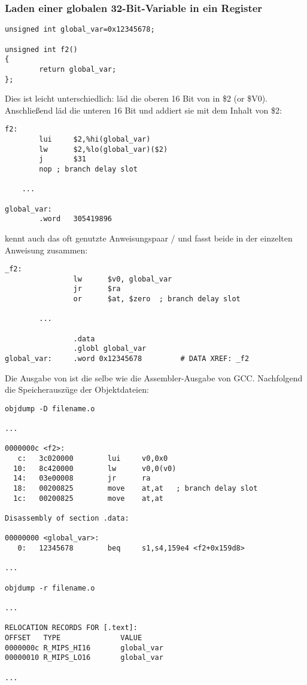 \subsubsection{Laden einer globalen 32-Bit-Variable in ein Register}

\begin{lstlisting}
unsigned int global_var=0x12345678;

unsigned int f2()
{
        return global_var;
};
\end{lstlisting}


Dies ist leicht unterschiedlich:  läd die oberen 16 Bit von 
in \$2 (or \$V0). Anschließend läd  die unteren 16 Bit und addiert sie mit
dem Inhalt von \$2:

\begin{lstlisting}[caption=GCC 4.4.5 -O3 (\assemblyOutput)]
f2:
        lui     $2,%hi(global_var)
        lw      $2,%lo(global_var)($2)
        j       $31
        nop	; branch delay slot

	...

global_var:
        .word   305419896
\end{lstlisting}

\IDA kennt auch das oft genutzte Anweisungspaar / und fasst beide
in der einzelten Anweisung  zusammen:

\begin{lstlisting}[caption=GCC 4.4.5 -O3 (IDA)]
_f2:
                lw      $v0, global_var
                jr      $ra
                or      $at, $zero	; branch delay slot

		...

                .data
                .globl global_var
global_var:     .word 0x12345678         # DATA XREF: _f2
\end{lstlisting}

Die Ausgabe von  ist die selbe wie die Assembler-Ausgabe von GCC.
Nachfolgend die Speicherauszüge der Objektdateien:

\begin{lstlisting}[caption=objdump]
objdump -D filename.o

...

0000000c <f2>:
   c:   3c020000        lui     v0,0x0
  10:   8c420000        lw      v0,0(v0)
  14:   03e00008        jr      ra
  18:   00200825        move    at,at	; branch delay slot
  1c:   00200825        move    at,at

Disassembly of section .data:

00000000 <global_var>:
   0:   12345678        beq     s1,s4,159e4 <f2+0x159d8>

...

objdump -r filename.o

...

RELOCATION RECORDS FOR [.text]:
OFFSET   TYPE              VALUE
0000000c R_MIPS_HI16       global_var
00000010 R_MIPS_LO16       global_var

...

\end{lstlisting}

